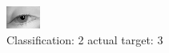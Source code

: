 \begin{figure}[h!]
\begin{center}
\includegraphics[width=0.60\columnwidth]{figures/ID2871_class_2_target_3.png}
\end{center}
\caption{ Classification: 2 actual target: 3}
\label{fig:ID2871_class_2_target_3}
\end{figure}
